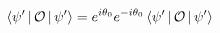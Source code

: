 \documentclass[preview]{standalone}
\begin{document}
\begin{align*}
\Braket{\psi '|\mathcal{O}|\psi '} = e^{i \theta_0}e^{-i \theta_0}\Braket{\psi ' |\mathcal{O}|\psi '}
\end{align*}
\end{document}
